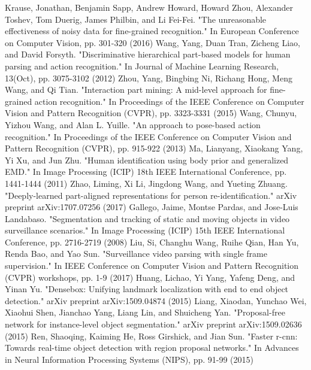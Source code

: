 \begin{thebibliography}{}
Krause, Jonathan, Benjamin Sapp, Andrew Howard, Howard Zhou, Alexander Toshev, Tom Duerig, James Philbin, and Li Fei-Fei. "The unreasonable effectiveness of noisy data for fine-grained recognition." In European Conference on Computer Vision, pp. 301-320 (2016)
%
Wang, Yang, Duan Tran, Zicheng Liao, and David Forsyth. "Discriminative hierarchical part-based models for human parsing and action recognition." In Journal of Machine Learning Research, 13(Oct), pp. 3075-3102 (2012)
Zhou, Yang, Bingbing Ni, Richang Hong, Meng Wang, and Qi Tian. "Interaction part mining: A mid-level approach for fine-grained action recognition." In Proceedings of the IEEE Conference on Computer Vision and Pattern Recognition (CVPR), pp. 3323-3331 (2015)
Wang, Chunyu, Yizhou Wang, and Alan L. Yuille. "An approach to pose-based action recognition." In Proceedings of the IEEE Conference on Computer Vision and Pattern Recognition (CVPR), pp. 915-922 (2013)
%
Ma, Lianyang, Xiaokang Yang, Yi Xu, and Jun Zhu. "Human identification using body prior and generalized EMD." In Image Processing (ICIP) 18th IEEE International Conference, pp. 1441-1444 (2011)
Zhao, Liming, Xi Li, Jingdong Wang, and Yueting Zhuang. "Deeply-learned part-aligned representations for person re-identification." arXiv preprint arXiv:1707.07256 (2017)
%
Gallego, Jaime, Montse Pardas, and Jose-Luis Landabaso. "Segmentation and tracking of static and moving objects in video surveillance scenarios." In Image Processing (ICIP) 15th IEEE International Conference, pp. 2716-2719 (2008)
Liu, Si, Changhu Wang, Ruihe Qian, Han Yu, Renda Bao, and Yao Sun. "Surveillance video parsing with single frame supervision." In IEEE Conference on Computer Vision and Pattern Recognition (CVPR) workshops, pp. 1-9 (2017)
% 
Huang, Lichao, Yi Yang, Yafeng Deng, and Yinan Yu. "Densebox: Unifying landmark localization with end to end object detection." arXiv preprint arXiv:1509.04874 (2015)
Liang, Xiaodan, Yunchao Wei, Xiaohui Shen, Jianchao Yang, Liang Lin, and Shuicheng Yan. "Proposal-free network for instance-level object segmentation." arXiv preprint arXiv:1509.02636 (2015)
Ren, Shaoqing, Kaiming He, Ross Girshick, and Jian Sun. "Faster r-cnn: Towards real-time object detection with region proposal networks." In Advances in Neural Information Processing Systems (NIPS), pp. 91-99 (2015)

\end{thebibliography}
